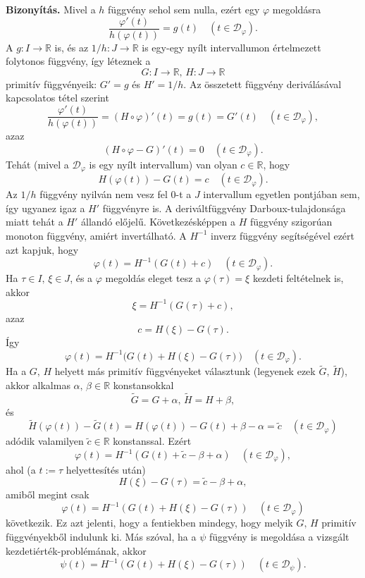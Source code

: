 \documentclass[12pt]{article}
\newcommand{\R}{\mathbb{R}}
\newcommand{\Dp}{\mathcal{D}_\varphi}
\begin{document}
    \textbf{Bizonyítás.} Mivel a $h$ függvény sehol sem nulla, ezért egy $\varphi$ megoldásra
    \[
        \frac{\varphi'(t)}{h(\varphi(t))} = g(t) \quad (t \in \Dp).
    \]
    A $g : I \to \R$ is, és az $1 / h : J \to \R$ is egy-egy nyílt intervallumon értelmezett folytonos függvény, így léteznek a
    \[
        G : I \to \R, \, H : J \to \R
    \]
    primitív függvényeik: $G' = g$ és $H' = 1/h$. Az összetett függvény deriválásával kapcsolatos tétel szerint
    \[
        \frac{\varphi'(t)}{h(\varphi(t))} = (H \circ \varphi)'(t) = g(t) = G'(t) \quad (t \in \Dp),
    \]
    azaz
    \[
        (H \circ \varphi - G)'(t) = 0 \quad (t \in \Dp).
    \]
    Tehát (mivel a $\Dp$ is egy nyílt intervallum) van olyan $c \in \R$, hogy
    \[
        H(\varphi(t)) - G(t) = c \quad (t \in \Dp).
    \]
    Az $1/h$ függvény nyilván nem vesz fel $0$-t a $J$ intervallum egyetlen pontjában sem, így ugyanez igaz a $H'$ függvényre is. A deriváltfüggvény Darboux-tulajdonsága miatt tehát a $H'$ állandó előjelű. Következésképpen a $H$ függvény szigorúan monoton függvény, amiért invertálható. A $H^{-1}$ inverz függvény segítségével ezért azt kapjuk, hogy
    \[
        \varphi(t) = H^{-1}(G(t) + c) \quad (t \in \Dp).
    \]
    Ha $\tau \in I, \, \xi \in J$, és a $\varphi$ megoldás eleget tesz a $\varphi(\tau) = \xi$ kezdeti feltételnek is, akkor
    \[
        \xi = H^{-1}(G(\tau) + c),
    \]
    azaz
    \[
        c = H(\xi) - G(\tau).
    \]
    Így
    \[
        \varphi(t) = H^{-1}\big(G(t) + H(\xi) - G(\tau)\big)  \quad (t \in \Dp).
    \]
    Ha a $G, \, H$ helyett más primitív függvényeket választunk (legyenek ezek $\tilde{G}, \, \tilde{H}$), akkor alkalmas $\alpha, \, \beta \in \R$ konstansokkal
    \[
        \tilde{G} = G + \alpha, \, \tilde{H} = H + \beta,
    \]
    és
    \[
        \tilde{H}(\varphi(t)) - \tilde{G}(t) = H(\varphi(t)) - G(t) + \beta - \alpha = \tilde{c} \quad (t \in \Dp)
    \]
    adódik valamilyen $\tilde{c} \in \R$ konstanssal. Ezért
    \[
        \varphi(t) = H^{-1}(G(t) + \tilde{c} - \beta + \alpha) \quad (t \in \Dp),
    \]
    ahol (a $t := \tau$ helyettesítés után)
    \[
        H(\xi) - G(\tau) = \tilde{c} - \beta + \alpha,
    \]
    amiből megint csak
    \[
        \varphi(t) = H^{-1}(G(t) + H(\xi) - G(\tau)) \quad (t \in \Dp)
    \]
    következik. Ez azt jelenti, hogy a fentiekben mindegy, hogy melyik $G, \, H$ primitív függvényekből indulunk ki. Más szóval, ha a $\psi$ függvény is megoldása a vizsgált kezdetiérték-problémának, akkor
    \[
        \psi(t) = H^{-1}(G(t) + H(\xi) - G(\tau)) \quad (t \in \mathcal{D}_\psi).
    \]
\end{document}
